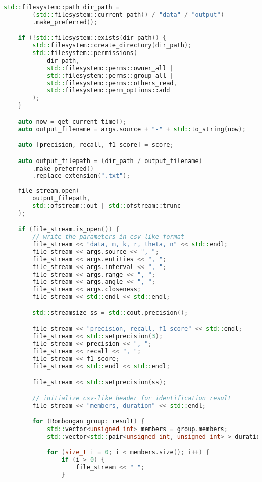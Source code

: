 \begin{lstlisting}[language=C++, caption=Implementasi 
modul \texttt{io.cpp},label={lamp:module-io}]
    std::filesystem::path dir_path = 
        (std::filesystem::current_path() / "data" / "output")
        .make_preferred();

    if (!std::filesystem::exists(dir_path)) {
        std::filesystem::create_directory(dir_path);
        std::filesystem::permissions(
            dir_path,
            std::filesystem::perms::owner_all |
            std::filesystem::perms::group_all |
            std::filesystem::perms::others_read,
            std::filesystem::perm_options::add
        );
    }

    auto now = get_current_time();
    auto output_filename = args.source + "-" + std::to_string(now);

    auto [precision, recall, f1_score] = score;

    auto output_filepath = (dir_path / output_filename)
        .make_preferred()
        .replace_extension(".txt");
    
    file_stream.open(
        output_filepath,
        std::ofstream::out | std::ofstream::trunc
    );

    if (file_stream.is_open()) {
        // write the parameters in csv-like format
        file_stream << "data, m, k, r, theta, n" << std::endl;
        file_stream << args.source << ", ";
        file_stream << args.entities << ", ";
        file_stream << args.interval << ", ";
        file_stream << args.range << ", ";
        file_stream << args.angle << ", ";
        file_stream << args.closeness;
        file_stream << std::endl << std::endl;

        std::streamsize ss = std::cout.precision();

        file_stream << "precision, recall, f1_score" << std::endl;
        file_stream << std::setprecision(3);
        file_stream << precision << ", ";
        file_stream << recall << ", ";
        file_stream << f1_score;
        file_stream << std::endl << std::endl;

        file_stream << std::setprecision(ss);

        // initialize csv-like header for identification result
        file_stream << "members, duration" << std::endl;

        for (Rombongan group: result) {
            std::vector<unsigned int> members = group.members;
            std::vector<std::pair<unsigned int, unsigned int> > duration = group.duration;

            for (size_t i = 0; i < members.size(); i++) {
                if (i > 0) {
                    file_stream << " ";
                }


\end{lstlisting}
